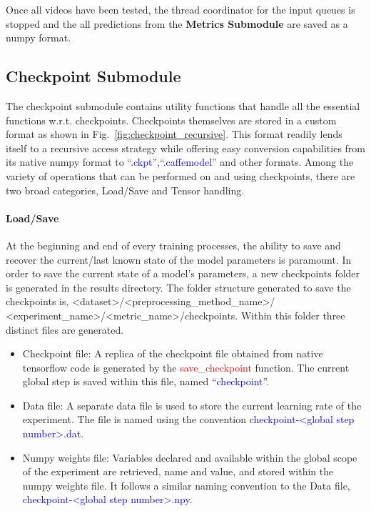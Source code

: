 \documentclass{llncs}
\begin{document}
Once all videos have been tested, the thread coordinator for the input queues is stopped and the all predictions from the \textbf{Metrics Submodule} are saved as a numpy format.

\subsection{Checkpoint Submodule}
\label{sec:checkpoint}
The checkpoint submodule contains utility functions that handle all the essential functions w.r.t. checkpoints.
Checkpoints themselves are stored in a custom format as shown in Fig.~\ref{fig:checkpoint_recursive}.
This format readily lends itself to a recursive access strategy while offering easy conversion capabilities from its native numpy format to ``\textcolor{blue}{.ckpt}'',``\textcolor{blue}{.caffemodel}'' and other formats.
Among the variety of operations that can be performed on and using checkpoints, there are two broad categories, Load/Save and Tensor handling.

\paragraph{Load/Save}
At the beginning and end of every training processes, the ability to save and recover the current/last known state of the model parameters is paramount.
In order to save the current state of a model's parameters, a new checkpoints folder is generated in the results directory.
The folder structure generated to save the checkpoints is, \textless dataset\textgreater/\textless preprocessing\_method\_name\textgreater/\\\textless experiment\_name\textgreater/\textless metric\_name\textgreater/checkpoints.
Within this folder three distinct files are generated.
\begin{itemize}
\item Checkpoint file: A replica of the checkpoint file obtained from native tensorflow code is generated by the \textcolor{red}{save\_checkpoint} function.
The current global step is saved within this file, named ``\textcolor{blue}{checkpoint}''.
\item Data file: A separate data file is used to store the current learning rate of the experiment.
The file is named using the convention \textcolor{blue}{checkpoint-\textless global step number\textgreater .dat}.
\item Numpy weights file: Variables declared and available within the global scope of the experiment are retrieved, name and value, and stored within the numpy weights file.
It follows a similar naming convention to the Data file, \textcolor{blue}{checkpoint-\textless global step number\textgreater .npy}.
\end{itemize}
\end{document}
